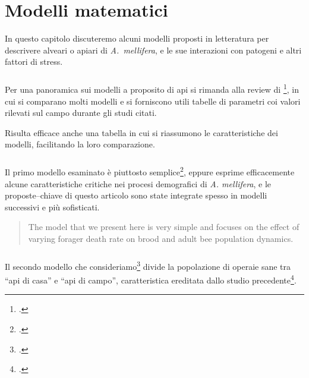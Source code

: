 \chapter{Modelli matematici}
\begin{flushright}
    \small
\end{flushright}

In questo capitolo discuteremo alcuni modelli proposti in letteratura per descrivere alveari o apiari di
\emph{A.~mellifera}, e le sue interazioni con patogeni e altri fattori di stress.

\paragraph{}
Per una panoramica sui modelli a proposito di api si rimanda alla review di
\citeauthor{chen_review}\footcite{chen_review}, in cui si comparano molti modelli e si forniscono utili
tabelle di parametri coi valori rilevati sul campo durante gli studi citati.

Risulta efficace anche una tabella in cui si riassumono le caratteristiche dei modelli, facilitando
la loro comparazione.


\paragraph{}
Il primo modello esaminato è piuttosto semplice\footcite{khoury2011}, eppure esprime efficacemente alcune
caratteristiche critiche nei procesi demografici di \emph{A. mellifera}, e le proposte--chiave di questo
articolo sono state integrate spesso in modelli successivi e più sofisticati.

\blockquote[\citeauthor{khoury2011}]{The model that we present here is very simple and focuses on the effect of varying forager death rate on brood and adult bee population dynamics.}

\paragraph{}
Il secondo modello che consideriamo\footcite{ratti2017} divide la popolazione di operaie sane tra ``api di casa''
e ``api di campo'', caratteristica ereditata dallo studio precedente\footcite{khoury2011}.

